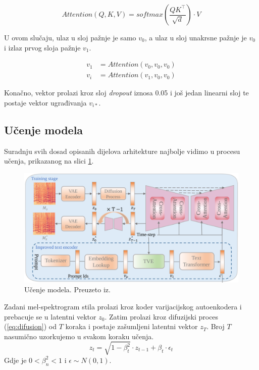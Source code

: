 \begin{equation}
    {Attention}(Q, K, V) = softmax(\frac{QK^\top}{\sqrt{d}})\cdot V
\end{equation}

U ovom slučaju, ulaz u sloj pažnje je samo $v_0$, a ulaz u sloj unakrsne pažnje je $v_0$ i izlaz prvog sloja pažnje $v_1$.

\begin{align}
    v_1  &= {Attention}(v_0, v_0, v_0) \\
    v_i &= {Attention}(v_1, v_0, v_0)
\end{align}

Konačno, vektor prolazi kroz sloj \textit{dropout} iznosa 0.05 i još jedan linearni sloj te postaje vektor ugrađivanja $v_{i*}$. 

\subsection{Učenje modela}
Suradnju svih dosad opisanih dijelova arhitekture najbolje vidimo u procesu učenja, prikazanog na slici \ref{fig:arhitektura_train}. 

\begin{figure}[H]
    \centering
    \includegraphics[width=0.9\linewidth]{imgs/train.png}
    \caption{Učenje modela. Preuzeto iz\cite{huang2024musicstyletransferdiffusion}.}
    \label{fig:arhitektura_train}
\end{figure}

Zadani mel-spektrogram stila prolazi kroz koder varijacijskog autoenkodera i prebacuje se u latentni vektor $z_0$. Zatim prolazi kroz difuzijski proces (\ref{eq:difusion}) od $T$ koraka i postaje zašumljeni latentni vektor $z_T$. Broj $T$  nasumično uzorkujemo u svakom koraku učenja.
\begin{equation}
    z_t = \sqrt{1 - \beta_t^2} \cdot z_{t-1} + \beta_t \cdot \epsilon_t
    \label{eq:difusion}
\end{equation}
Gdje je $0 < \beta_n^2 < 1$ i $\epsilon \sim N(0, 1)$.

